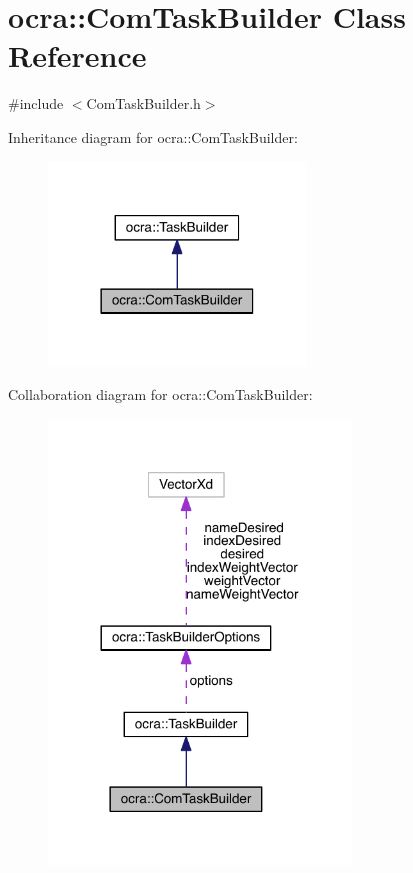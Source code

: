 \hypertarget{classocra_1_1ComTaskBuilder}{}\section{ocra\+:\+:Com\+Task\+Builder Class Reference}
\label{classocra_1_1ComTaskBuilder}


{\ttfamily \#include $<$Com\+Task\+Builder.\+h$>$}



Inheritance diagram for ocra\+:\+:Com\+Task\+Builder\+:\nopagebreak
\begin{figure}[H]
\begin{center}
\leavevmode
\includegraphics[width=194pt]{d9/dcf/classocra_1_1ComTaskBuilder__inherit__graph}
\end{center}
\end{figure}


Collaboration diagram for ocra\+:\+:Com\+Task\+Builder\+:\nopagebreak
\begin{figure}[H]
\begin{center}
\leavevmode
\includegraphics[width=228pt]{df/d8d/classocra_1_1ComTaskBuilder__coll__graph}
\end{center}
\end{figure}
